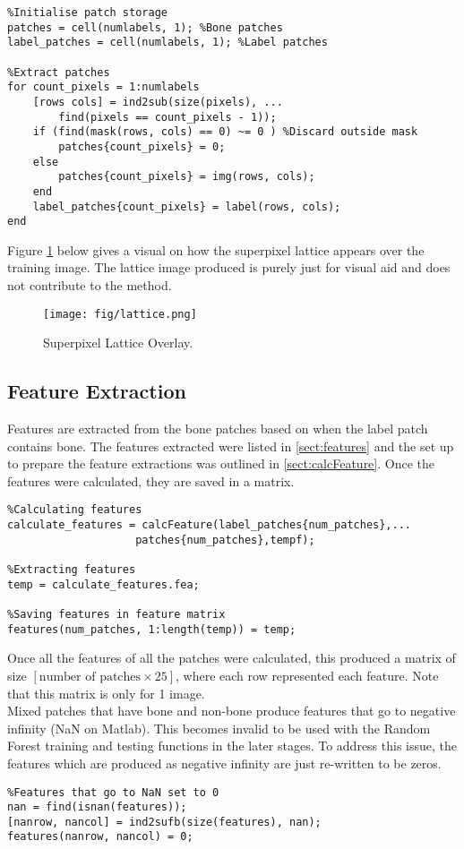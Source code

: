 \begin{lstlisting}
%Initialise patch storage
patches = cell(numlabels, 1); %Bone patches
label_patches = cell(numlabels, 1); %Label patches

%Extract patches
for count_pixels = 1:numlabels
    [rows cols] = ind2sub(size(pixels), ...
        find(pixels == count_pixels - 1));
    if (find(mask(rows, cols) == 0) ~= 0 ) %Discard outside mask
        patches{count_pixels} = 0; 
    else
        patches{count_pixels} = img(rows, cols);
    end
    label_patches{count_pixels} = label(rows, cols);
end
\end{lstlisting} 
\bigskip
Figure \ref{fig: superpixel} below gives a visual on how the superpixel lattice appears over the training image. The lattice image produced is purely just for visual aid and does not contribute to the method. 

\begin{figure}[H]
\centering
\texttt{[image: fig/lattice.png]}
\caption{Superpixel Lattice Overlay.}
\label{fig: superpixel}
\end{figure}
\subsection{Feature Extraction}
Features are extracted from the bone patches based on when the label patch contains bone. The features extracted were listed in \ref{sect:features} and the set up to prepare the feature extractions was outlined in \ref{sect:calcFeature}. Once the features were calculated, they are saved in a matrix. 
\begin{lstlisting}
%Calculating features
calculate_features = calcFeature(label_patches{num_patches},...
					patches{num_patches},tempf);

%Extracting features
temp = calculate_features.fea;

%Saving features in feature matrix
features(num_patches, 1:length(temp)) = temp;
\end{lstlisting}
\bigskip
Once all the features of all the patches were calculated, this produced a matrix of size $[\textrm{number of patches} \times 25]$, where each row represented each feature. Note that this matrix is only for 1 image. 
\\[1\baselineskip]
Mixed patches that have bone and non-bone produce features that go to negative infinity (NaN on Matlab). This becomes invalid to be used with the Random Forest training and testing functions in the later stages. To address this issue, the features which are produced as negative infinity are just re-written to be zeros. 
\begin{lstlisting}
%Features that go to NaN set to 0
nan = find(isnan(features));
[nanrow, nancol] = ind2sufb(size(features), nan);
features(nanrow, nancol) = 0;
\end{lstlisting}

